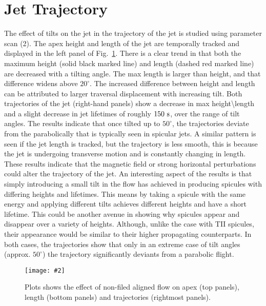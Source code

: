 \documentclass[12pt]{ociamthesis}
\newcommand{\mfig}[4]{
  \begin{figure}
  \begin{center}
  \texttt{[image: \#2]}
  \caption{#3}
  \label{#4}
  \end{center}
  \end{figure}}
\begin{document}
\section{Jet Trajectory}
\label{sec:j_traj_t}
The effect of tilts on the jet in the trajectory of the jet is studied using parameter scan (2). The apex height and length of the jet are temporally tracked and displayed in the left panel of Fig.~\ref{tilt_effect_traj}. There is a clear trend in that both the maximum height (solid black marked line) and length (dashed red marked line) are decreased with a tilting angle. The max length is larger than height, and that difference widens above $20^{\circ}$. The increased difference between height and length can be attributed to larger traversal displacement with increasing tilt. Both trajectories of the jet (right-hand panels) show a decrease in max height\textbackslash length and a slight decrease in jet lifetimes of roughly $150~\rm{s}$, over the range of tilt angles. The results indicate that once tilted up to $50^{\circ}$, the trajectories deviate from the parabolically that is typically seen in spicular jets. A similar pattern is seen if the jet length is tracked, but the trajectory is less smooth, this is because the jet is undergoing transverse motion and is constantly changing in length. These results indicate that the magnetic field or strong horizontal perturbations could alter the trajectory of the jet. An interesting aspect of the results is that simply introducing a small tilt in the flow has achieved in producing spicules with differing heights and lifetimes. This means by taking a spicule with the same energy and applying different tilts achieves different heights and have a short lifetime. This could be another avenue in showing why spicules appear and disappear over a variety of heights. Although, unlike the case with TII spicules, their appearance would be similar to their higher propagating counterparts. In both cases, the trajectories show that only in an extreme case of tilt angles (approx. $50^{\circ}$) the trajectory significantly deviants from a parabolic flight.  
%
\mfig{1}{figures/combine_L_h_comp.png}{Plots shows the effect of non-filed aligned flow on apex (top panels), length (bottom panels) and trajectories (rightmost panels).}{tilt_effect_traj}
\end{document}
